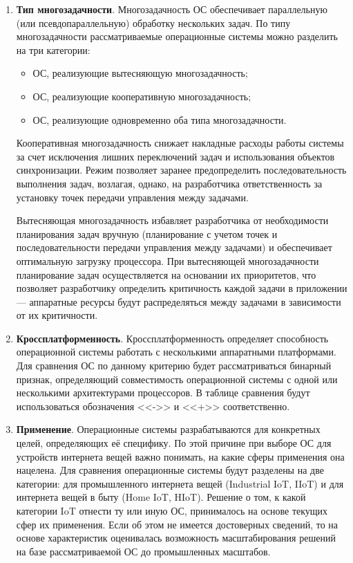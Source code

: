 \begin{enumerate}[label*=\arabic*.]
	\item \textbf{Тип многозадачности}. \newline
	Многозадачность ОС обеспечивает параллельную (или псевдопараллельную) обработку нескольких задач. По типу многозадачности рассматриваемые операционные системы можно разделить на три категории:
	
	\begin{itemize}[label*=---]
		\item ОС, реализующие вытесняющую многозадачность;
		\item ОС, реализующие кооперативную многозадачность;
		\item ОС, реализующие одновременно оба типа многозадачности.
	\end{itemize}
	
	Кооперативная многозадачность снижает накладные расходы работы системы за счет исключения лишних переключений задач и использования объектов синхронизации. Режим позволяет заранее предопределить последовательность выполнения задач, возлагая, однако, на разработчика ответственность за установку точек передачи управления между задачами.
	
	Вытесняющая многозадачность избавляет разработчика от необходимости планирования задач вручную (планирование с учетом точек и последовательности передачи управления между задачами) и обеспечивает оптимальную загрузку процессора. При вытесняющей многозадачности планирование задач осуществляется на основании их приоритетов, что позволяет разработчику определить критичность каждой задачи в приложении --- аппаратные ресурсы будут распределяться между задачами в зависимости от их критичности.
	
	\item \textbf{Кроссплатформенность}. \newline
	Кроссплатформенность определяет способность операционной системы работать с несколькими аппаратными платформами. Для сравнения ОС по данному критерию будет рассматриваться бинарный признак, определяющий совместимость операционной системы с одной или несколькими архитектурами процессоров. В таблице сравнения будут использоваться обозначения <<->> и <<+>> соответственно.
	
	\item \textbf{Применение}. \newline
	Операционные системы разрабатываются для конкретных целей, определяющих её специфику. По этой причине при выборе ОС для устройств интернета вещей важно понимать, на какие сферы применения она нацелена. Для сравнения операционные системы будут разделены на две категории: для промышленного интернета вещей (Industrial IoT, IIoT) и для интернета вещей в быту (Home IoT, HIoT). Решение о том, к какой категории IoT отнести ту или иную ОС, принималось на основе текущих сфер их применения. Если об этом не имеется достоверных сведений, то на основе характеристик оценивалась возможность масштабирования решений на базе рассматриваемой ОС до промышленных масштабов.
	
\end{enumerate}

